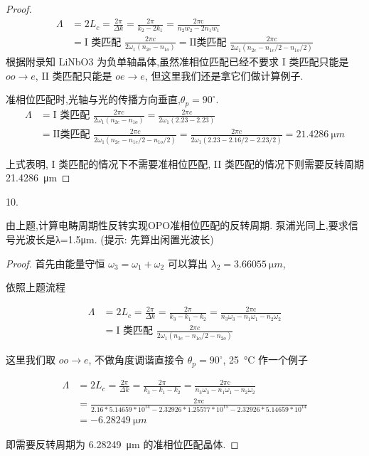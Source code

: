\begin{proof}
$$
\begin{aligned}
\Lambda &=2 L_{c}=\frac{2\pi}{\Delta k}=\frac{2 \pi}{k_{2}-2 k_{1}}=\frac{2 \pi \mathrm{c}}{n_{2} w_{2}-2 n_{1} w_{1}} \\
&=\text{I 类匹配 }\frac{2 \pi c}{2 \omega_1 \left(n_{2e}-n_{1o}\right)}=\text{II类匹配 } \frac{2 \pi c}{2 \omega_1 \left(n_{2e}-n_{1e}/2-n_{1o}/2\right)}
\end{aligned}
$$
根据附录知 LiNbO3 为负单轴晶体,虽然准相位匹配已经不要求 I 类匹配只能是 $oo\rightarrow e$, 
II 类匹配只能是 $oe\rightarrow e$, 但这里我们还是拿它们做计算例子.

准相位匹配时,光轴与光的传播方向垂直,$\theta_p=90^\circ$.
$$
\begin{aligned}
\Lambda &=\text{I 类匹配 }\frac{2 \pi c}{2 \omega_1 \left(n_{2e}-n_{1o}\right)}=\frac{2 \pi c}{2 \omega_1 \left(2.23-2.23\right)}\\
&=\text{II类匹配 } \frac{2 \pi c}{2 \omega_1 \left(n_{2e}-n_{1e}/2-n_{1o}/2\right)}=\frac{2 \pi c}{2 \omega_1 \left(2.23-2.16/2-2.23/2 \right)}=\SI{21.4286}{\micro m}
\end{aligned}
$$

上式表明, I 类匹配的情况下不需要准相位匹配, II 类匹配的情况下则需要反转周期 \SI{21.4286}{\micro m}
\end{proof}

\begin{exercise}

10. 

由上题,计算电畴周期性反转实现OPO准相位匹配的反转周期. 泵浦光同上,要求信号光波长是λ=1.5μm. (提示: 先算出闲置光波长)
\end{exercise}

\begin{proof}
首先由能量守恒 $\omega_3=\omega_1+\omega_2$ 可以算出 $\lambda_2=\SI{3.66055}{\micro m}$,

依照上题流程

$$
\begin{aligned}
\Lambda &=2 L_{c}=\frac{2\pi}{\Delta k}=\frac{2 \pi}{k_{3}- k_{1}-k_{2}}
=\frac{2 \pi \mathrm{c}}{n_{3} \omega_{3}- n_{1} \omega_{1}-n_2\omega_2} \\
&=\text{I 类匹配 }\frac{2 \pi c}{2 \omega_1 \left(n_{3e}-n_{1o}/2-n_{2o}\right)}
\end{aligned}
$$

这里我们取 $oo\rightarrow e$, 不做角度调谐直接令 $\theta_p=90^\circ$, \SI{25}{\celsius} 作一个例子

$$
\begin{aligned}
\Lambda &=2 L_{c}=\frac{2\pi}{\Delta k}=\frac{2 \pi}{k_{3}- k_{1}-k_{2}}
=\frac{2 \pi \mathrm{c}}{n_{3} \omega_{3}- n_{1} \omega_{1}-n_2\omega_2} \\
&=\frac{2 \pi \mathrm{c}}{2.16*5.14659*10^{14} - 2.32926* 1.25577*10^{15}-2.32926*5.14659*10^{14}} \\
&=\SI{-6.28249}{\micro m}
\end{aligned}
$$

即需要反转周期为 \SI{6.28249}{\micro m} 的准相位匹配晶体.
\end{proof}

